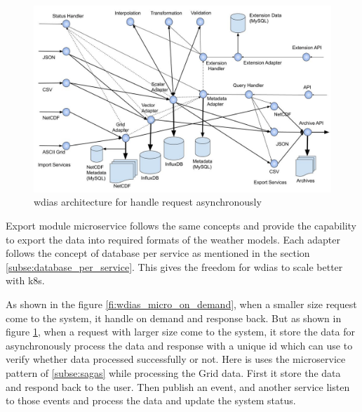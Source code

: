 \begin{figure}[htp]
    \centering
    \includegraphics[width=1\textwidth]{method/microservice/microservice_architecture-handle_on_async-v3.jpg}
    \caption{\acrshort{wdias} architecture for handle request asynchronously}
    \label{fi:wdias_micro_async}
\end{figure}
Export module microservice follows the same concepts and provide the capability to export the data into required formats of the weather models.
Each adapter follows the concept of database per service as mentioned in the section \ref{subse:database_per_service}. This gives the freedom for \acrshort{wdias} to scale better with \acrshort{k8s}.

As shown in the figure \ref{fi:wdias_micro_on_demand}, when a smaller size request come to the system, it handle on demand and response back. But as shown in figure \ref{fi:wdias_micro_async}, when a request with larger size come to the system, it store the data for asynchronously process the data and response with a unique id which can use to verify whether data processed successfully or not. Here is uses the microservice pattern of \ref{subse:sagas} while processing the Grid data. First it store the data and respond back to the user. Then publish an event, and another service listen to those events and process the data and update the system status.

